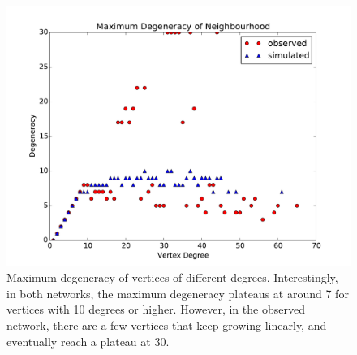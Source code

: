 \documentclass[11pt,a4paper]{article}
\begin{document}
\begin{figure}[htbp]
	\centering
	\includegraphics[scale=0.55]{exp_max_degeneracies.pdf}
	\caption{Maximum degeneracy of vertices of different degrees. Interestingly, in both networks, the maximum degeneracy plateaus at around 7 for vertices with 10 degrees or higher. However, in the observed network, there are a few vertices that keep growing linearly, and eventually reach a plateau at 30.}
	\label{fig:exp_max_degeneracies}
\end{figure}

\clearpage


\end{document}

